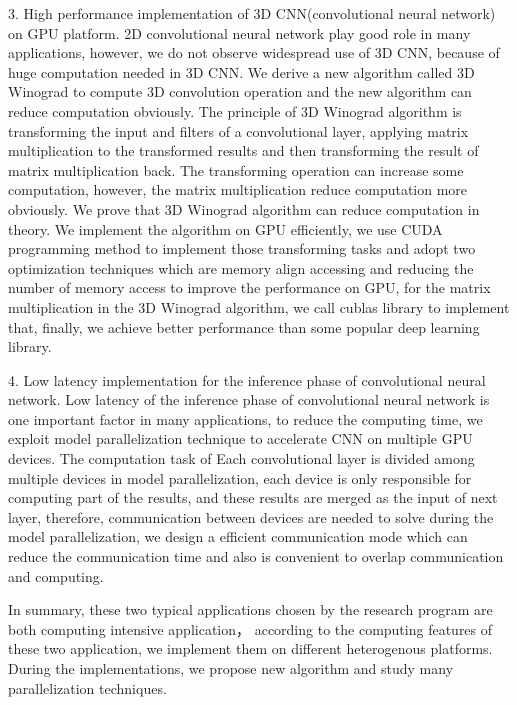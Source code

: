 \begin{eabstract}
\begin{compactitem}
\item[3.]High performance implementation of 3D CNN(convolutional neural network) on GPU platform. 2D convolutional neural network play good role in many applications, however, we do not observe widespread use of 3D CNN, because of huge computation needed in 3D CNN. We derive a new algorithm called 3D Winograd to compute 3D convolution operation and the new algorithm can reduce computation obviously. The principle of 3D Winograd algorithm is transforming the input and filters of a convolutional layer, applying matrix multiplication to the transformed results and then transforming the result of matrix multiplication back. The transforming operation can increase some computation, however, the matrix multiplication reduce computation more obviously. We prove that 3D Winograd algorithm can reduce computation in theory. We implement the algorithm on GPU efficiently, we use CUDA programming method to implement those transforming tasks and adopt two optimization techniques which are memory align accessing and reducing the number of memory access to improve the performance on GPU, for the matrix multiplication in the 3D Winograd algorithm, we call cublas library to implement that, finally, we achieve better performance than some popular deep learning library.

\item[4.]Low latency implementation for the inference phase of convolutional neural network. Low latency of the inference phase of convolutional neural network is one important factor in many applications, to reduce the computing time, we exploit model parallelization technique to accelerate CNN on multiple GPU devices. The computation task of Each convolutional layer is divided among multiple devices in model parallelization, each device is only responsible for computing part of the results, and these results are merged as the input of next layer, therefore, communication between devices are needed to solve during the model parallelization, we design a efficient communication mode which can reduce the communication time and also is convenient to overlap communication and computing. 

\end{compactitem}

In summary, these two typical applications chosen by the research program are both computing intensive application， according to the computing features of these two application, we implement them on different heterogenous platforms. During the implementations, we propose new algorithm and study many parallelization techniques. 
\end{eabstract}
